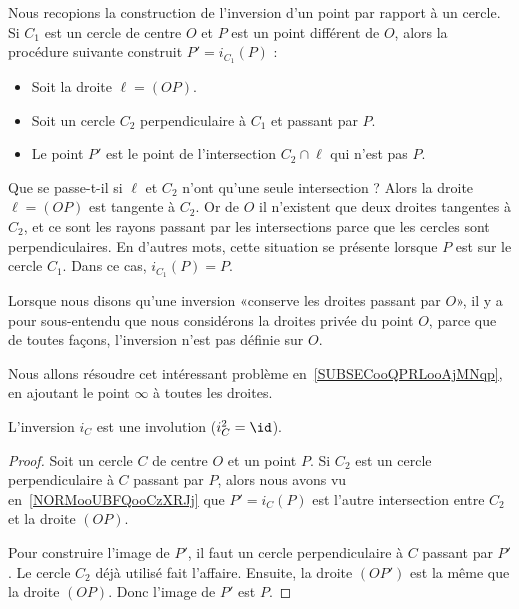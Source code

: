\begin{normaltext}      \label{NORMooUBFQooCzXRJj}
    Nous recopions la construction de l'inversion d'un point par rapport à un cercle. Si \( C_1\) est un cercle de centre \( O\) et \( P\) est un point différent de \( O\), alors la procédure suivante construit \( P'=i_{C_1}(P)\) :
    \begin{itemize}
        \item Soit la droite \( \ell=(OP)\).
        \item Soit un cercle \( C_2\) perpendiculaire à \( C_1\) et passant par \( P\).
        \item Le point \( P'\) est le point de l'intersection \( C_2\cap\ell\) qui n'est pas \( P\).
    \end{itemize}
    Que se passe-t-il si \( \ell\) et \( C_2\) n'ont qu'une seule intersection ? Alors la droite \( \ell=(OP)\) est tangente à \( C_2\). Or de \( O \) il n'existent que deux droites tangentes à \( C_2\), et ce sont les rayons passant par les intersections parce que les cercles sont perpendiculaires. En d'autres mots, cette situation se présente lorsque \( P\) est sur le cercle \( C_1\). Dans ce cas, \( i_{C_1}(P)=P\).
\end{normaltext}

\begin{remark}
    Lorsque nous disons qu'une inversion «conserve les droites passant par \( O\)», il y a pour sous-entendu que nous considérons la droites privée du point \( O\), parce que de toutes façons, l'inversion n'est pas définie sur \( O\).

    Nous allons résoudre cet intéressant problème en~\ref{SUBSECooQPRLooAjMNqp}, en ajoutant le point \( \infty\) à toutes les droites.
\end{remark}

\begin{corollary}
    L'inversion \( i_C\) est une involution (\( i_C^2=\id\)).
\end{corollary}

\begin{proof}
    Soit un cercle \( C\) de centre \( O\) et un point \( P\). Si \( C_2\) est un cercle perpendiculaire à \( C\) passant par \( P\), alors nous avons vu en~\ref{NORMooUBFQooCzXRJj} que \( P'=i_C(P)\) est l'autre intersection entre \( C_2\) et la droite \( (OP)\).

    Pour construire l'image de \( P'\), il faut un cercle perpendiculaire à \( C\) passant par \( P'\). Le cercle \( C_2\) déjà utilisé fait l'affaire. Ensuite, la droite \( (OP')\) est la même que la droite \( (OP)\). Donc l'image de \( P'\) est \( P\).
\end{proof}

